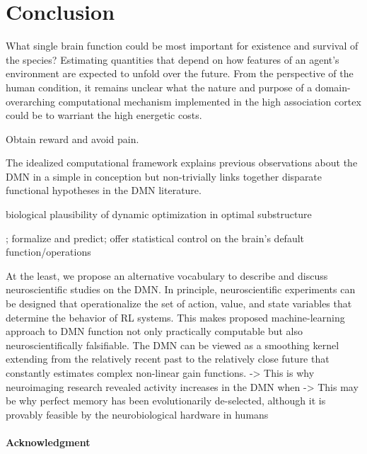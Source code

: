 \documentclass{article} %
\begin{document}
\section{Conclusion}
What single brain function could be most important for existence and survival of the species?
Estimating quantities that depend on how features of an agent’s environment are expected to unfold over the future.
From the perspective of the human condition, it remains unclear what the nature and purpose of a domain-overarching computational mechanism implemented in the high association cortex could be to warriant the high energetic costs.

Obtain reward and avoid pain.

The idealized computational framework explains previous observations about the
DMN in a simple in conception but non-trivially links
together disparate functional hypotheses in the DMN literature.

biological plausibility of dynamic optimization in
optimal substructure

; formalize and predict; offer statistical control on the brain's default function/operations

At the least, we propose an alternative vocabulary to
describe and discuss neuroscientific studies on the DMN.
%
In principle,
neuroscientific experiments can be designed that operationalize
the set of action, value, and state variables that determine
the behavior of RL systems. This makes proposed machine-learning
approach to DMN function not only practically computable but
also neuroscientifically falsifiable.
%
The DMN can be viewed as a smoothing kernel extending
from the relatively recent past to the relatively close future
that constantly estimates complex non-linear gain functions.
-> This is why neuroimaging research revealed activity increases in the DMN
when 
-> This may be why perfect memory has been evolutionarily de-selected,
although it is provably feasible by the neurobiological hardware in humans




\paragraph{Acknowledgment}


\small


\end{document}
